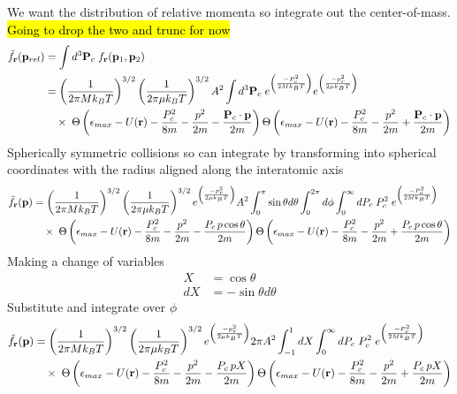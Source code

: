 We want the distribution of relative momenta so integrate out the center-of-mass. \hl{Going to drop the two and trunc for now}
\begin{equation}
\begin{split}
	 \tilde{f}_{\mathbf{r}}(\mathbf{p}_{rel}) & = \int d^3 \mathbf{P}_c \; f_{\mathbf{r}} (\mathbf{p}_1, \mathbf{p}_2) \\
	 &= \left(\frac{1}{2 \pi M k_B T}\right)^{3/2} \left(\frac{1}{2 \pi \mu k_B T}\right)^{3/2} A^2 \int d^3 \mathbf{P}_c \; e^{\left(\frac{-P_c^2}{2 M k_B T}\right)} e^{\left(\frac{-p_r^2}{2 \mu k_B T}\right)} \\ 
	 &\quad \times \; \Theta \left( {\epsilon_{max} - U(\mathbf{r}) - \frac{P_c^2}{8m} - \frac{p^2}{2m} - \frac{\mathbf{P}_c \cdot \mathbf{p}}{2m}} \right) \Theta \left( {\epsilon_{max} - U(\mathbf{r}) - \frac{P_c^2}{8m} - \frac{p^2}{2m} + \frac{\mathbf{P}_c \cdot \mathbf{p}}{2m}} \right) 
\end{split}
\end{equation}
Spherically symmetric collisions so can integrate by transforming into spherical coordinates with the radius aligned along the interatomic axis
\begin{equation}
\begin{split}
	 \tilde{f}_{\mathbf{r}}(\mathbf{p}) &= \left(\frac{1}{2 \pi M k_B T}\right)^{3/2} \left(\frac{1}{2 \pi \mu k_B T}\right)^{3/2} e^{\left(\frac{-p_r^2}{2 \mu k_B T}\right)} A^2  \int_0^{\pi} \sin \theta d\theta \int_0^{2\pi} d\phi \int_0^{\infty} dP_c \; P_c^2 \; e^{\left(\frac{-P_c^2}{2 M k_B T}\right)} \\ 
	 &\quad \times \; \Theta \left( {\epsilon_{max} - U(\mathbf{r}) - \frac{P_c^2}{8m} - \frac{p^2}{2m} - \frac{P_c \, p \cos \theta}{2m}} \right) \Theta \left( {\epsilon_{max} - U(\mathbf{r}) - \frac{P_c^2}{8m} - \frac{p^2}{2m} + \frac{P_c \, p \cos \theta}{2m}} \right) 
\end{split}
\end{equation}
Making a change of variables
\begin{equation*}
\begin{split}
	X  &= \cos \theta \\
	dX &= - \sin \theta d \theta
\end{split}
\end{equation*}
Substitute and integrate over $\phi$
\begin{equation}
\begin{split}
	 \tilde{f}_{\mathbf{r}}(\mathbf{p}) &= \left(\frac{1}{2 \pi M k_B T}\right)^{3/2} \left(\frac{1}{2 \pi \mu k_B T}\right)^{3/2} e^{\left(\frac{-p_r^2}{2 \mu k_B T}\right)} 2 \pi A^2  \int_{-1}^1 dX \int_0^{\infty} dP_c \; P_c^2 \; e^{\left(\frac{-P_c^2}{2 M k_B T}\right)} \\ 
	 &\quad \times \; \Theta \left( {\epsilon_{max} - U(\mathbf{r}) - \frac{P_c^2}{8m} - \frac{p^2}{2m} - \frac{P_c \, p X}{2m}} \right) \Theta \left( {\epsilon_{max} - U(\mathbf{r}) - \frac{P_c^2}{8m} - \frac{p^2}{2m} + \frac{P_c \, p X}{2m}} \right) 
\end{split}
\end{equation}
